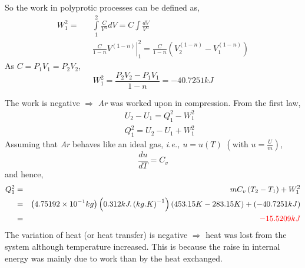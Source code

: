\documentclass[12pts,a4paper,amsmath,amssymb,floatfix]{article}%
\newcommand{\ie}{{\em{i.e., }}}
\begin{document}
\begin{enumerate}[label=\bfseries Example \arabic*:]
So the work in polyprotic processes can be defined as,
\begin{eqnarray}
W_{1}^{2} = && \int\limits_{1}^{2}\displaystyle\frac{C}{V^{n}}dV = C \int\displaystyle\frac{dV}{V^{n}} \nonumber \\
           && \left.\displaystyle\frac{C}{1-n} V^{(1-n)} \right|_{1}^{2} = \displaystyle\frac{C}{1-n}  \left( V_{2}^{(1-n)}-V_{1}^{(1-n)}\right) \nonumber
\end{eqnarray}
As $C = P_{1}V_{1} = P_{2}V_{2}$,
\begin{displaymath}
W_{1}^{2} = \displaystyle\frac{P_{2}V_{2}-P_{1}V_{1}}{1-n} = -40.7251 kJ
\end{displaymath}


The work is negative $\Longrightarrow$ {\it Ar} was worked upon in compression. From the first law,
\begin{eqnarray}
&& U_{2} - U_{1} = Q_{1}^{2} - W_{1}^{2} \nonumber \\
&& Q_{1}^{2} = U_{2} - U_{1} + W_{1}^{2} \nonumber 
\end{eqnarray}
Assuming that {\it Ar} behaves like an ideal gas, \ie $u=u(T)$ $\left(\text{with }u=\displaystyle\frac{U}{m}\right)$, 
\begin{displaymath}
\displaystyle\frac{du}{dT} = C_{v}
\end{displaymath}
and hence,
\begin{eqnarray}
Q_{1}^{2} &=& mC_{v}\left(T_{2} - T_{1}\right) + W_{1}^{2} \nonumber \\
         &=& \left( 4.75192\times 10^{-1} kg \right) \left( 0.312 kJ.\left(kg.K\right)^{-1} \right) \nonumber \left( 453.15 K - 283.15 K \right) + \left( -40.7251 kJ \right) \nonumber \\
         &=& \textcolor{red}{-15.5209 kJ} \nonumber
\end{eqnarray}
The variation of heat (or heat transfer) is negative $\Longrightarrow$ heat was lost from the system although temperature increased. This is because the raise in internal energy was mainly due to work than by the heat exchanged.   


\end{enumerate}
\end{document}
